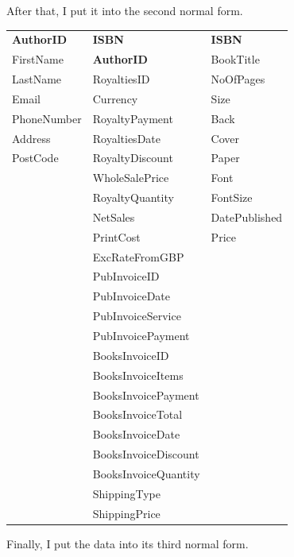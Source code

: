 \newpage
After that, I put it into the second normal form.

\begin{tabular}{|p{2.5cm}|p{3.5cm}|p{2.5cm}|}
    \hline
    \textbf{AuthorID} & \textbf{ISBN} & \textbf{ISBN} \\
    FirstName & \textbf{AuthorID} & BookTitle \\
    LastName & RoyaltiesID & NoOfPages \\
    Email  & Currency & Size \\
    PhoneNumber & RoyaltyPayment & Back \\
    Address & RoyaltiesDate & Cover \\
    PostCode & RoyaltyDiscount & Paper \\
    & WholeSalePrice & Font \\
    & RoyaltyQuantity & FontSize \\
    & NetSales & DatePublished \\
    & PrintCost & Price \\
    & ExcRateFromGBP & \\
    & PubInvoiceID & \\
    & PubInvoiceDate & \\
    & PubInvoiceService & \\
    & PubInvoicePayment & \\
    & BooksInvoiceID & \\
    & BooksInvoiceItems & \\
    & BooksInvoicePayment & \\
    & BooksInvoiceTotal & \\
    & BooksInvoiceDate & \\
    & BooksInvoiceDiscount & \\
    & BooksInvoiceQuantity & \\
    & ShippingType & \\
    & ShippingPrice & \\
    \hline
\end{tabular}

\newpage
Finally, I put the data into its third normal form.


